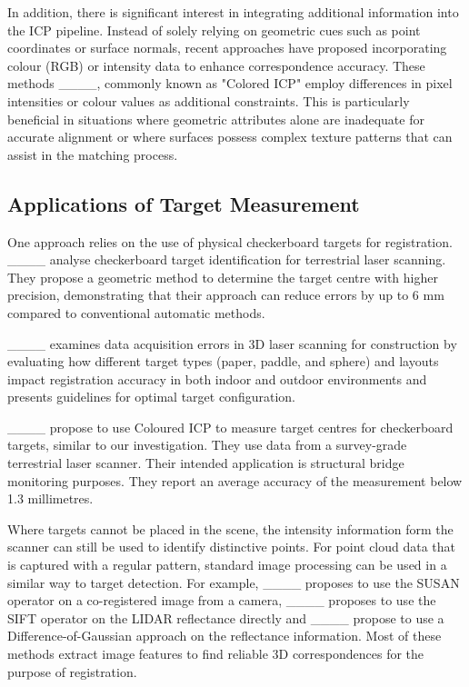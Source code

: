 In addition, there is significant interest in integrating additional information into the ICP pipeline. Instead of solely relying on geometric cues such as point coordinates or surface normals, recent approaches have proposed incorporating colour (RGB) or intensity data to enhance correspondence accuracy. These methods ____, commonly known as "Colored ICP" employ differences in pixel intensities or colour values as additional constraints. This is particularly beneficial in situations where geometric attributes alone are inadequate for accurate alignment or where surfaces possess complex texture patterns that can assist in the matching process.

\subsection{Applications of Target Measurement}

One approach relies on the use of physical checkerboard targets for registration. ____ analyse checkerboard target identification for terrestrial laser scanning. They propose a geometric method to determine the target centre with higher precision, demonstrating that their approach can reduce errors by up to 6 mm compared to conventional automatic methods.

____ examines data acquisition errors in 3D laser scanning for construction by evaluating how different target types (paper, paddle, and sphere) and layouts impact registration accuracy in both indoor and outdoor environments and presents guidelines for optimal target configuration.

____ propose to use Coloured ICP to measure target centres for checkerboard targets, similar to our investigation. They use data from a survey-grade terrestrial laser scanner. Their intended application is structural bridge monitoring purposes. They report an average accuracy of the measurement below 1.3 millimetres.

Where targets cannot be placed in the scene, the intensity information form the scanner can still be used to identify distinctive points. For point cloud data that is captured with a regular pattern, standard image processing can be used in a similar way to target detection. For example, ____ proposes to use the SUSAN operator on a co-registered image from a camera, ____ proposes to use the SIFT operator on the LIDAR reflectance directly and ____ propose to use a Difference-of-Gaussian approach on the reflectance information.
Most of these methods extract image features to find reliable 3D correspondences for the purpose of registration.

